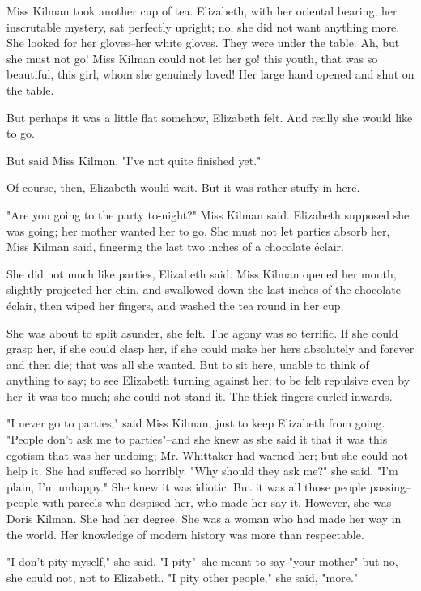 \documentclass[lang=cn,10pt]{elegantbook}
\begin{document}
Miss Kilman took another cup of tea.  Elizabeth, with her oriental
bearing, her inscrutable mystery, sat perfectly upright; no, she
did not want anything more.  She looked for her gloves--her white
gloves.  They were under the table.  Ah, but she must not go!  Miss
Kilman could not let her go! this youth, that was so beautiful,
this girl, whom she genuinely loved!  Her large hand opened and
shut on the table.

But perhaps it was a little flat somehow, Elizabeth felt.  And
really she would like to go.

But said Miss Kilman, "I've not quite finished yet."

Of course, then, Elizabeth would wait.  But it was rather stuffy in
here.

"Are you going to the party to-night?" Miss Kilman said.  Elizabeth
supposed she was going; her mother wanted her to go.  She must not
let parties absorb her, Miss Kilman said, fingering the last two
inches of a chocolate éclair.

She did not much like parties, Elizabeth said.  Miss Kilman opened
her mouth, slightly projected her chin, and swallowed down the last
inches of the chocolate éclair, then wiped her fingers, and washed
the tea round in her cup.

She was about to split asunder, she felt.  The agony was so
terrific.  If she could grasp her, if she could clasp her, if she
could make her hers absolutely and forever and then die; that was
all she wanted.  But to sit here, unable to think of anything to
say; to see Elizabeth turning against her; to be felt repulsive
even by her--it was too much; she could not stand it.  The thick
fingers curled inwards.

"I never go to parties," said Miss Kilman, just to keep Elizabeth
from going.  "People don't ask me to parties"--and she knew as she
said it that it was this egotism that was her undoing; Mr.
Whittaker had warned her; but she could not help it.  She had
suffered so horribly.  "Why should they ask me?" she said.  "I'm
plain, I'm unhappy."  She knew it was idiotic.  But it was all
those people passing--people with parcels who despised her, who
made her say it.  However, she was Doris Kilman.  She had her
degree.  She was a woman who had made her way in the world.  Her
knowledge of modern history was more than respectable.

"I don't pity myself," she said.  "I pity"--she meant to say "your
mother" but no, she could not, not to Elizabeth.  "I pity other
people," she said, "more."
\end{document}
